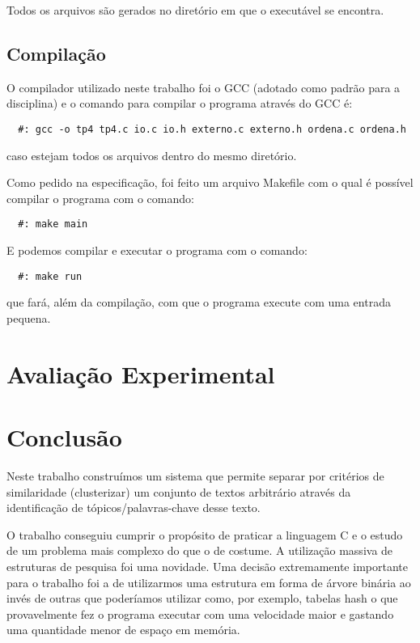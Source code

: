 \documentclass[12pt]{article}
\begin{document}
Todos os arquivos são gerados no diretório em que o executável se encontra.

\subsection{Compilação}
O compilador utilizado neste trabalho foi o GCC (adotado como padrão para a disciplina) e 
o comando para compilar o programa através do GCC é:
\begin{verbatim}
  #: gcc -o tp4 tp4.c io.c io.h externo.c externo.h ordena.c ordena.h
\end{verbatim}
caso estejam todos os arquivos dentro do mesmo diretório.

Como pedido na especificação, foi feito um arquivo Makefile com o qual é possível compilar
o programa com o comando: 
\begin{verbatim}
  #: make main
\end{verbatim}

E podemos compilar e executar o programa com o comando:
\begin{verbatim}
  #: make run
\end{verbatim}
que fará, além da compilação, com que o programa execute com uma entrada pequena.

\section{Avaliação Experimental}
\label{avaliacao_experimental}



\section{Conclusão}
\label{conclusao}

Neste trabalho construímos um sistema que permite separar por critérios de similaridade
(clusterizar) um conjunto de textos arbitrário através da identificação de 
tópicos/palavras-chave desse texto.

O trabalho conseguiu cumprir o propósito de praticar a linguagem C e o estudo de um 
problema mais complexo do que o de costume. A utilização massiva de estruturas de pesquisa
foi uma novidade. Uma decisão extremamente importante para o trabalho foi a de utilizarmos 
uma estrutura em forma de árvore binária ao invés de outras que poderíamos utilizar como,
por exemplo, tabelas hash o que provavelmente fez o programa executar com uma velocidade 
maior e gastando uma quantidade menor de espaço em memória.
\end{document}
